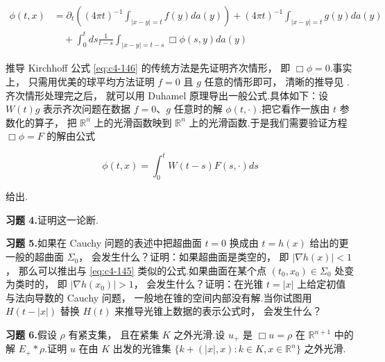 \begin{equation}
\begin{aligned}
\phi(t, x) &= \partial_{t}\left((4\pi t)^{-1}\int_{|x-y|=t}f(y)da(y)\right) + (4\pi t)^{-1}\int_{|x-y|=t}g(y)da(y) \\
&\quad + \int_{0}^{t}ds\frac{1}{t-s}\int_{|x-y|=t-s}\Box\phi(s, y)da(y)
\end{aligned}\label{eq:c4-146}
\end{equation}

推导 Kirchhoff 公式 \eqref{eq:c4-146} 的传统方法是先证明齐次情形， 即 $\Box\phi = 0$.事实上， 只需用优美的球平均方法证明 $f = 0$ 且 $g$ 任意的情形即可， 清晰的推导见 \cite{j}.齐次情形处理完之后， 就可以用 Duhamel 原理导出一般公式.具体如下：设 $W(t)g$ 表示齐次问题在数据 $f = 0$、$g$ 任意时的解 $\phi(t, \cdot)$.把它看作一族由 $t$ 参数化的算子， 把 $\mathbb{R}^{n}$ 上的光滑函数映到 $\mathbb{R}^{n}$ 上的光滑函数.于是我们需要验证方程 $\Box\phi = F$ 的解由公式

\begin{equation}
\phi(t, x) = \int_{0}^{t}W(t-s)F(s, \cdot)ds\label{eq:c4-147}
\end{equation}

给出.

\noindent\textbf{习题 4.}\quad 证明这一论断.

\noindent\textbf{习题 5.}\quad 如果在 Cauchy 问题的表述中把超曲面 $t = 0$ 换成由 $t = h(x)$ 给出的更一般的超曲面 $\Sigma_{0}$， 会发生什么？证明：如果超曲面是类空的， 即 $|\nabla h(x)| < 1$， 那么可以推出与 \eqref{eq:c4-145} 类似的公式.如果曲面在某个点 $(t_{0}, x_{0}) \in \Sigma_{0}$ 处变为类时的， 即 $|\nabla h(x_{0})| > 1$， 会发生什么？证明：在光锥 $t = |x|$ 上给定初值与法向导数的 Cauchy 问题， 一般地在锥的空间内部没有解.当你试图用 $H(t-|x|)$ 替换 $H(t)$ 来推导光锥上数据的表示公式时， 会发生什么？

\noindent\textbf{习题 6.}\quad 假设 $\rho$ 有紧支集， 且在紧集 $K$ 之外光滑.设 $u_{+}$ 是 $\Box u = \rho$ 在 $\mathbb{R}^{n+1}$ 中的解 $E_{+}*\rho$.证明 $u$ 在由 $K$ 出发的光锥集 $\{k + (|x|, x) : k \in K, x \in \mathbb{R}^{n}\}$ 之外光滑.

